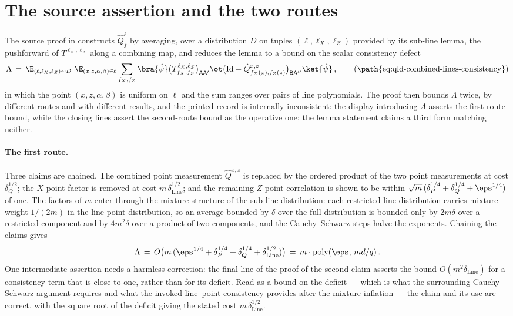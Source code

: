 \documentclass[11pt]{article}
\DeclareMathOperator{\poly}{poly}
\newcommand{\Id}{\mathrm{Id}}
\begin{document}
\section{The source assertion and the two routes}

The source proof in \cite{Ji2020MIPStar} constructs $\hat Q^{\ell}_f$ by
averaging, over a distribution $D$ on tuples $(\ell, \ell_X, \ell_Z)$
provided by its sub-line lemma, the pushforward of
$T^{\ell_X,\ell_Z}$ along a combining map, and reduces the lemma to a
bound on the scalar consistency defect
\begin{equation}
  \Lambda \,=\,
  \E_{(\ell,\ell_X,\ell_Z) \sim D}\
  \E_{(x,z,\alpha,\beta) \in \ell}
  \sum_{f_X,f_Z} \bra{\hat\psi}
  \big(T^{\ell_X,\ell_Z}_{f_X,f_Z}\big)_{\mathsf{A}\mathsf{A}'} \ot
  \big(\Id - \hat{Q}^{x,z}_{f_X(x),f_Z(z)}\big)_{\mathsf{B}\mathsf{A}''}
  \ket{\hat\psi}\,,
  \tag{\path{eq:qld-combined-lines-consistency}}
\end{equation}
in which the point $(x,z,\alpha,\beta)$ is uniform on $\ell$ and the sum
ranges over pairs of line polynomials.  The proof then bounds $\Lambda$
twice, by different routes and with different results, and the printed
record is internally inconsistent: the display introducing $\Lambda$
asserts the first-route bound, while the closing lines assert the
second-route bound as the operative one; the lemma statement claims a
third form matching neither.

\paragraph{The first route.}
Three claims are chained.  The combined point measurement
$\hat Q^{x,z}$ is replaced by the ordered product of the two point
measurements at cost $\delta_Q^{1/2}$; the $X$-point factor is removed at
cost $m\,\delta_{\mathrm{Line}}^{1/2}$; and the remaining $Z$-point
correlation is shown to be within
$\sqrt{m}\,(\delta_P^{1/4} + \delta_Q^{1/4} + \eps^{1/4})$ of one.  The
factors of $m$ enter through the mixture structure of the sub-line
distribution: each restricted line distribution carries mixture weight
$1/(2m)$ in the line-point distribution, so an average bounded by
$\delta$ over the full distribution is bounded only by $2m\delta$ over a
restricted component and by $4m^2\delta$ over a product of two
components, and the Cauchy--Schwarz steps halve the exponents.  Chaining
the claims gives
\begin{equation*}
  \Lambda \,=\, O\big(m\,(\eps^{1/4} + \delta_P^{1/4} + \delta_Q^{1/4}
  + \delta_{\mathrm{Line}}^{1/2})\big)
  \,=\, m \cdot \poly(\eps,\, md/q)\,.
\end{equation*}
One intermediate assertion needs a harmless correction: the final line
of the proof of the second claim asserts the bound
$O(m^2 \delta_{\mathrm{Line}})$ for a consistency term that is close to
one, rather than for its deficit.  Read as a bound on the deficit ---
which is what the surrounding Cauchy--Schwarz argument requires and what
the invoked line--point consistency provides after the mixture
inflation --- the claim and its use are correct, with the square root of
the deficit giving the stated cost $m\,\delta_{\mathrm{Line}}^{1/2}$.
\end{document}
